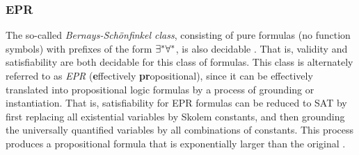 \documentclass[10pt]{article}
\begin{document}
\subsubsection*{EPR}

The so-called \textit{Bernays-Sch\"{o}nfinkel class}, consisting of pure formulas (no function symbols) with prefixes of the form $\exists^*\forall^*$, is also decidable \cite{lewis1980complexity}. That is, validity and satisfiability are both decidable for this class of formulas. This class is alternately referred to as \textit{EPR} (\textbf{e}ffectively \textbf{pr}opositional), since it can be effectively translated into propositional logic formulas by a process of grounding or instantiation. That is, satisfiability for EPR formulas can be reduced to SAT by first replacing all existential variables by Skolem constants, and then grounding the universally quantified variables by all combinations of constants. This process produces a propositional formula that is exponentially larger than the original \cite{demoura2008deciding}.








\end{document}
